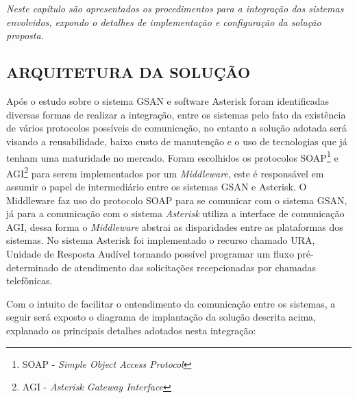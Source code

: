 \chapter[Middleware: GSAN e Asterisk]{\fontsize{12}{1} }

\textit{Neste capítulo são apresentados os procedimentos para a integração dos sistemas envolvidos, expondo o detalhes de implementação e configuração da solução proposta.}


\section{\fontsize{12}{1} \selectfont\textbf{\uppercase{Arquitetura da Solução}}{}}

Após o estudo sobre o sistema GSAN e software Asterisk foram identificadas diversas formas de realizar a integração, entre os sistemas pelo fato da existência de vários protocolos possíveis de comunicação, no entanto a solução adotada será visando a reusabilidade, baixo custo de manutenção e o uso de tecnologias que já tenham uma maturidade no mercado. Foram escolhidos os protocolos SOAP\footnote{SOAP - \textit{Simple Object Access Protocol}} e AGI\footnote{AGI - \textit{Asterisk Gateway Interface}} para serem implementados por um \textit{Middleware}, este é responsável em assumir o papel de intermediário entre os sistemas GSAN e Asterisk. O Middleware faz uso do protocolo SOAP para se comunicar com o sistema GSAN, já para a comunicação com o sistema \textit{Asterisk} utiliza a interface de comunicação AGI, dessa forma o \textit{Middleware} abstrai as disparidades entre as plataformas dos sistemas. No sistema Asterisk foi implementado o recurso chamado URA, Unidade de Resposta Audível tornando possível programar um fluxo pré-determinado de atendimento das solicitações recepcionadas por chamadas telefônicas.

Com o intuito de facilitar o entendimento da comunicação entre os sistemas, a seguir será exposto o diagrama de implantação da solução descrita acima, explanado os principais detalhes adotados nesta integração:


